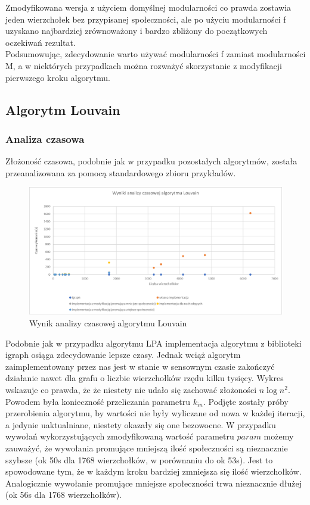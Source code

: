\documentclass{article}
\begin{document}
Zmodyfikowana wersja z użyciem domyślnej modularności co prawda zostawia jeden wierzchołek bez przypisanej społeczności, ale po użyciu modularności f uzyskano najbardziej zrównoważony i bardzo zbliżony do początkowych oczekiwań rezultat.\\

Podsumowując, zdecydowanie warto używać modularności f zamiast modularności M, a w niektórych przypadkach można rozważyć skorzystanie z modyfikacji pierwszego kroku algorytmu.
\subsection{Algorytm Louvain}
\subsubsection{Analiza czasowa}
Złożoność czasowa, podobnie jak w przypadku pozostałych algorytmów, została przeanalizowana za pomocą standardowego zbioru przykładów.

\begin{figure}[H]
\centering
\includegraphics[width=\textwidth]{images/pw-louvein-time.png}
\caption{Wynik analizy czasowej algorytmu Louvain}
\end{figure}

Podobnie jak w przypadku algorytmu LPA implementacja algorytmu z biblioteki igraph osiąga zdecydowanie lepsze czasy. Jednak wciąż algorytm zaimplementowany przez nas jest w stanie w sensownym czasie zakończyć działanie nawet dla grafu o liczbie wierzchołków rzędu kilku tysięcy. Wykres wskazuje co prawda, że  że niestety nie udało się zachować złożoności $n\log{n}^2$. Powodem była konieczność przeliczania parametru $k_{in}$. Podjęte zostały  próby przerobienia algorytmu, by wartości nie były wyliczane od nowa w każdej iteracji, a jedynie uaktualniane, niestety okazały się one bezowocne. W przypadku wywołań wykorzystujących zmodyfikowaną wartość parametru $param$ możemy zauważyć, że wywołania promujące mniejszą ilość społeczności są nieznacznie szybsze (ok 50s dla 1768 wierzchołków, w porównaniu do ok 53s). Jest to spowodowane tym, że w każdym kroku bardziej zmniejsza się ilość wierzchołków. Analogicznie wywołanie promujące mniejsze społeczności trwa nieznacznie dłużej (ok 56s dla 1768 wierzchołków).\\
\end{document}
